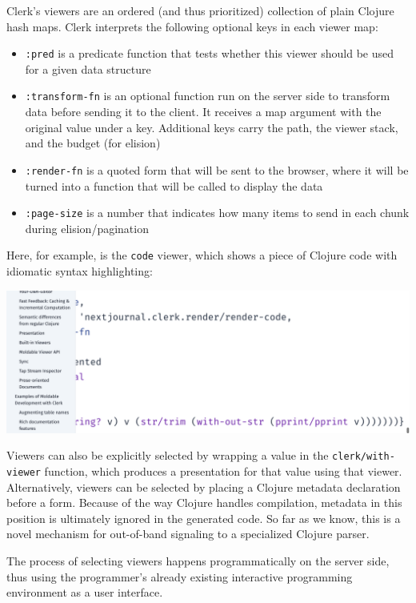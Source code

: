 \documentclass[sigconf,screen]{acmart}
\newcommand{\passthrough}[1]{#1}
\providecommand{\tightlist}{%
  \setlength{\itemsep}{0pt}\setlength{\parskip}{0pt}}
\begin{document}
Clerk's viewers are an ordered (and thus prioritized) collection of plain Clojure hash maps. Clerk interprets the following optional keys in each viewer map:

\begin{itemize}
\tightlist
\item
  \passthrough{\lstinline!:pred!} is a predicate function that tests whether this viewer should be used for a given data structure
\item
  \passthrough{\lstinline!:transform-fn!} is an optional function run on the server side to transform data before sending it to the client. It receives a map argument with the original value under a key. Additional keys carry the path, the viewer stack, and the budget (for elision)
\item
  \passthrough{\lstinline!:render-fn!} is a quoted form that will be sent to the browser, where it will be turned into a function that will be called to display the data
\item
  \passthrough{\lstinline!:page-size!} is a number that indicates how many items to send in each chunk during elision/pagination
\end{itemize}

Here, for example, is the \passthrough{\lstinline!code!} viewer, which shows a piece of Clojure code with idiomatic syntax highlighting:

\includegraphics{images/result-anon-expr-5drCPuwp8LirNTWeyr5WSDHWVV2rnC.png}

Viewers can also be explicitly selected by wrapping a value in the \passthrough{\lstinline!clerk/with-viewer!} function, which produces a presentation for that value using that viewer. Alternatively, viewers can be selected by placing a Clojure metadata declaration before a form. Because of the way Clojure handles compilation, metadata in this position is ultimately ignored in the generated code. So far as we know, this is a novel mechanism for out-of-band signaling to a specialized Clojure parser.

The process of selecting viewers happens programmatically on the server side, thus using the programmer's already existing interactive programming environment as a user interface.
\end{document}
